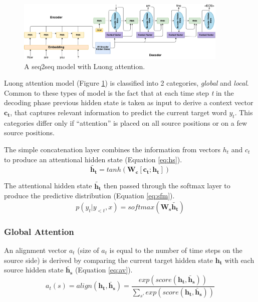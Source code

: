 \begin{figure}[hbt]
  \centering
  \includegraphics[width=0.9\textwidth]{figures/luong_decoder.pdf}
  \caption{A seq2seq model with Luong attention.}
  \label{fig:luong}
\end{figure}

Luong attention model \cite{luong2015effective} (Figure \ref{fig:luong}) is classified into 2 categories, \textit{global} and \textit{local}. Common to these types of model is the fact that at each time step \textit{t} in the decoding phase previous hidden state is taken as input to derive a context vector $\mathbf{c_t}$, that captures relevant information to predict the current target word $y_t$. This categories differ only if ``attention'' is placed on all source positions or on a few source positions.

The simple concatenation layer combines the information from vectors $h_t$ and $c_t$ to produce an attentional hidden state (Equation \ref{eq:hs}).
\begin{equation} \label{eq:hs}
\mathbf{\widetilde{h_t}} = tanh(\mathbf{W_c}[\mathbf{c_t};\mathbf{h_t}])
\end{equation}

The attentional hidden state $\mathbf{\widetilde{h_t}}$ then passed through the softmax layer to produce the predictive distribution (Equation \ref{eq:sfm}).
\begin{equation} \label{eq:sfm}
p(y_t|y_{<t},x) = softmax(\mathbf{W_s}\mathbf{\widetilde{h_t}})
\end{equation}

\subsubsection{Global Attention}
An alignment vector $a_t$ (size of $a_t$ is equal to the number of time steps on the source side) is derived by comparing the current target hidden state $\mathbf{h_t}$ with each source hidden state $\mathbf{\bar{h}_s}$ (Equation \ref{eq:av}).
\begin{equation} \label{eq:av}
a_t(s) = align(\mathbf{h_t}, \mathbf{\bar{h}_s}) = \frac{exp(score(\mathbf{h_t}, \mathbf{\bar{h}_s}))}{\sum_{s'} exp(score(\mathbf{h_t}, \mathbf{\bar{h}_s}))}
\end{equation}

